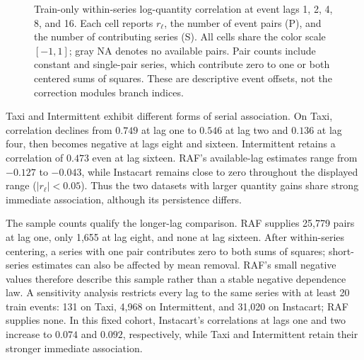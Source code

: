 \documentclass[runningheads]{llncs}
\providecommand{\Description}[1]{}
\begin{document}
\begin{figure}[t]
\caption{Train-only within-series log-quantity correlation at event lags 1, 2, 4, 8, and 16. Each cell reports $r_{\ell}$, the number of event pairs (P), and the number of contributing series (S). All cells share the color scale $[-1,1]$; gray NA denotes no available pairs. Pair counts include constant and single-pair series, which contribute zero to one or both centered sums of squares. These are descriptive event offsets, not the correction module\textquotesingle{}s branch indices.}
\label{fig:train-lag-correlation}
\Description{A four-by-five heatmap. Taxi correlation declines from 0.749 at lag one to negative values at lags eight and sixteen. Intermittent remains positive, declining from 0.928 to 0.473. RAF has small negative correlations through lag eight and no pairs at lag sixteen. Instacart correlations remain close to zero. Pair and series counts are printed in every cell.}
\end{figure}

Taxi and Intermittent exhibit different forms of serial association.
On Taxi, correlation declines from $0.749$ at lag one to $0.546$ at lag two
and $0.136$ at lag four, then becomes negative at lags eight and sixteen.
Intermittent retains a correlation of $0.473$ even at lag sixteen.
RAF's available-lag estimates range from $-0.127$ to $-0.043$, while
Instacart remains close to zero throughout the displayed range
($|r_{\ell}|<0.05$). Thus the two datasets with larger quantity gains
share strong immediate association, although its persistence differs.

The sample counts qualify the longer-lag comparison. RAF supplies 25,779
pairs at lag one, only 1,655 at lag eight, and none at lag sixteen.
After within-series centering, a series with one pair contributes zero
to both sums of squares; short-series estimates can also be affected by
mean removal. RAF's small negative values therefore describe this sample
rather than a stable negative dependence law. A sensitivity analysis
restricts every lag to the same series with at least 20 train events:
131 on Taxi, 4,968 on Intermittent, and 31,020 on Instacart; RAF supplies
none. In this fixed cohort, Instacart's correlations at lags one and two
increase to $0.074$ and $0.092$, respectively, while Taxi and
Intermittent retain their stronger immediate association.
\end{document}

